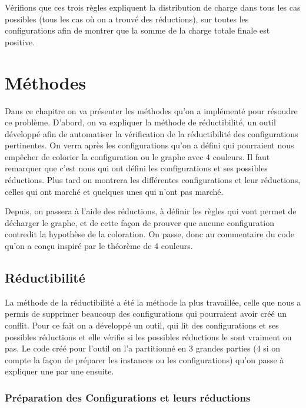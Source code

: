 \documentclass[10pt,a4paper]{article}
\begin{document}
Vérifions que ces trois règles expliquent la distribution de charge dans tous les cas possibles (tous les cas où on a trouvé des réductions), sur toutes les configurations afin de montrer que la somme de la charge totale finale est positive.
\section{Méthodes}

Dans ce chapitre on va présenter les méthodes qu'on a implémenté pour résoudre ce problème. D'abord, on va expliquer la méthode de réductibilité, un outil développé afin de automatiser la vérification de la réductibilité des configurations pertinentes. On verra après les configurations qu'on a défini qui pourraient nous empêcher de colorier la configuration ou le graphe avec 4 couleurs. Il faut remarquer que c'est nous qui ont défini les configurations et ses possibles réductions. Plus tard on montrera les différentes configurations et leur réductions, celles qui ont marché et quelques unes qui n'ont pas marché. 

Depuis, on passera à l'aide des réductions, à définir les règles qui vont permet de décharger le graphe, et de cette façon de prouver que aucune configuration contredit la hypothèse de la coloration. On passe, donc au commentaire du code qu'on a conçu inspiré par le théorème de 4 couleurs.


\subsection{Réductibilité}

La méthode de la réductibilité a été la méthode la plus travaillée, celle que nous a permis de supprimer beaucoup des configurations qui pourraient avoir créé un conflit. Pour ce fait on a développé un outil, qui lit des configurations et ses possibles réductions et elle vérifie si les possibles réductions le sont vraiment ou pas. Le code créé pour l'outil on l'a partitionné en 3 grandes parties (4 si on compte la façon de préparer les instances ou les configurations) qu'on passe à expliquer une par une ensuite.

\subsubsection{Préparation des Configurations et leurs réductions}
\end{document}
